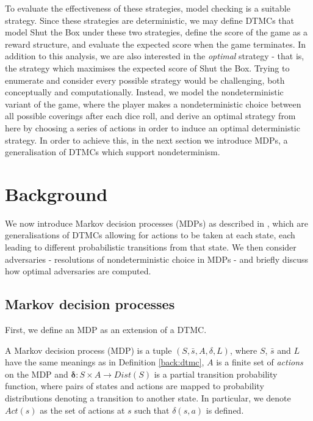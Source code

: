 To evaluate the effectiveness of these strategies, model checking is a suitable strategy. Since these strategies are deterministic, we may define DTMCs that model Shut the Box under these two strategies, define the score of the game as a reward structure, and evaluate the expected score when the game terminates. In addition to this analysis, we are also interested in the \emph{optimal} strategy - that is, the strategy which maximises the expected score of Shut the Box. Trying to enumerate and consider every possible strategy would be challenging, both conceptually and computationally. Instead, we model the nondeterministic variant of the game, where the player makes a nondeterministic choice between all possible coverings after each dice roll, and derive an optimal strategy from here by choosing a series of actions in order to induce an optimal deterministic strategy. In order to achieve this, in the next section we introduce MDPs, a generalisation of DTMCs which support nondeterminism.

\section{Background}
\label{cs1:stb_background}

We now introduce Markov decision processes (MDPs) as described in \cite{forejt_automated_2011}, which are generalisations of DTMCs allowing for actions to be taken at each state, each leading to different probabilistic transitions from that state. We then consider adversaries - resolutions of nondeterministic choice in MDPs - and briefly discuss how optimal adversaries are computed.

\subsection{Markov decision processes}
\label{cs1:mdps}
First, we define an MDP as an extension of a DTMC.

\begin{definition}
\label{cs1:def_mdps}

A Markov decision process (MDP) is a tuple $(S, \bar{s}, A, \delta, L)$, where $S$, $\bar{s}$ and $L$ have the same meanings as in Definition \ref{back:dtmc}, $A$ is a finite set of \emph{actions} on the MDP and  $\mathbf{\delta} : S \times A \rightarrow Dist(S)$ is a partial transition probability function, where pairs of states and actions are mapped to probability distributions denoting a transition to another state. In particular, we denote $Act(s)$ as the set of actions at $s$ such that $\delta(s, a)$ is defined.
\end{definition}

